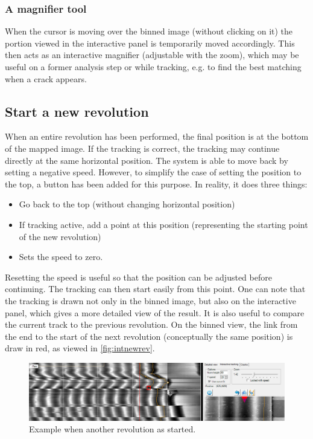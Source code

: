 \subsubsection{A magnifier tool}

When the cursor is moving over the binned image (without clicking on it) the portion viewed in the interactive panel is temporarily moved accordingly. This then acts as an interactive magnifier (adjustable with the zoom), which may be useful on a former analysis step or while tracking, e.g. to find the best matching when a crack appears.

\subsection{Start a new revolution}

When an entire revolution has been performed, the final position is at the bottom of the mapped image. If the tracking is correct, the tracking may continue directly at the same horizontal position. The system is able to move back by setting a negative speed. However, to simplify the case of setting the position to the top, a button has been added for this purpose. In reality, it does three things:

\begin{itemize}
\item Go back to the top (without changing horizontal position)
\item If tracking active, add a point at this position (representing the starting point of the new revolution)
\item Sets the speed to zero.
\end{itemize}

Resetting the speed is useful so that the position can be adjusted before continuing. The tracking can then start easily from this point. One can note that the tracking is drawn not only in the binned image, but also on the interactive panel, which gives a more detailed view of the result. It is also useful to compare the current track to the previous revolution. On the binned view, the link from the end to the start of the next revolution (conceptually the same position) is draw in red, as viewed in \autoref{fig:intnewrev}.

\begin{figure}[!ht]
\centering
\includegraphics[width=1.0\textwidth]{images/int-new-rev}
\caption{Example when another revolution as started.}
\label{fig:intnewrev}
\end{figure}

